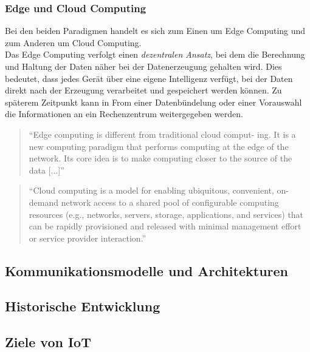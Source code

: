         \subsubsection*{Edge und Cloud Computing}
            Bei den beiden Paradigmen handelt es sich zum Einen um Edge Computing und zum Anderen um Cloud Computing.
            \\
            Das Edge Computing verfolgt einen \textit{dezentralen Ansatz}, bei dem die Berechnung und Haltung der Daten näher bei der Datenerzeugung gehalten wird. 
            Dies bedeutet, dass jedes Gerät über eine eigene Intelligenz verfügt, bei der Daten direkt nach der Erzeugung verarbeitet und gespeichert werden können. 
            Zu späterem Zeitpunkt kann in From einer Datenbündelung oder einer Vorauswahl die Informationen an ein Rechenzentrum weitergegeben werden. 
            \begin{quote}
                “Edge computing is different from traditional cloud comput- ing. It is a new computing paradigm that performs computing at the edge 
                of the network. Its core idea is to make computing closer to the source of the data [...]” \cite{Cao2020}
            \end{quote}
            \begin{quote}
                “Cloud computing is a model for enabling ubiquitous, convenient, on-demand network access to a shared pool of configurable 
                computing resources (e.g., networks, servers, storage, applications, and services) that can be rapidly provisioned and 
                released with minimal management effort or service provider interaction.” \cite{Mell2011}
            \end{quote}
    
    \subsection{Kommunikationsmodelle und Architekturen}

    \subsection{Historische Entwicklung}

    \subsection{Ziele von \acs{IoT}}
    \label{subsec:ziele-iot}
